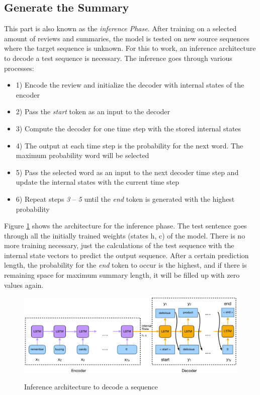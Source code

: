 \subsection{Generate the Summary}\label{ss:generate}

This part is also known as the \textit{ inference Phase}. After training on a selected amount of reviews and summaries, the model is tested on new source sequences where the target sequence is unknown. For this to work, an inference architecture to decode a test sequence is necessary. The inference goes through various processes:

\begin{itemize}
	\item 1) Encode the review and initialize the decoder with internal states of the encoder
	\item 2) Pass the \textit{start} token as an input to the decoder
	\item 3) Compute the decoder for one time step with the stored internal states
	\item 4) The output at each time step is the probability for the next word. The maximum probability word will be selected
	\item 5) Pass the selected word as an input to the next decoder time step and update the internal states with the current time step
	\item 6) Repeat steps \textit{3} – \textit{5} until the \textit{end} token is generated with the highest probability
\end{itemize}

Figure \ref{infer} shows the architecture for the inference phase. The test sentence goes through all the initially trained weights (states h, c) of the model. There is no more training necessary, just the calculations of the test sequence with the internal state vectors to predict the output sequence. After a certain prediction length, the probability for the \textit{end} token to occur is the highest, and if there is remaining space for maximum summary length, it will be filled up with zero values again. 

\begin{figure}
	\begin{center}
		\includegraphics[width=5in]{photos/infer-1}\\
		\caption{Inference architecture to decode a sequence}\label{infer}
	\end{center}
\end{figure}

